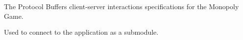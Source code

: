 The Protocol Buffers client-\/server interactions specifications for the Monopoly Game.

Used to connect to the application as a submodule. 